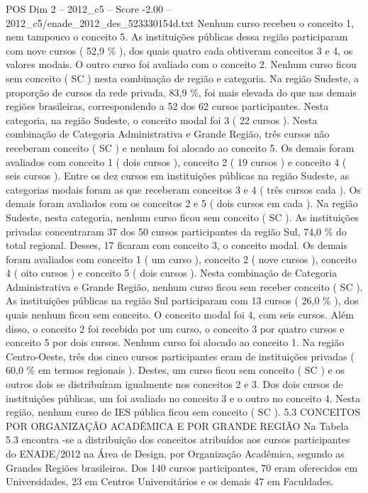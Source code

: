 \begin{textsample}{POS Dim 2 – 2012\_c5 – Score -2.00 – 2012\_c5/enade\_2012\_des\_523330154d.txt}
Nenhum curso recebeu o conceito 1, nem tampouco o conceito 5.
As instituições públicas dessa região participaram com nove cursos ( 52,9 \% ), dos quais quatro cada obtiveram conceitos 3 e 4, os valores modais.
O outro curso foi avaliado com o conceito 2.
Nenhum curso ficou sem conceito ( SC ) nesta combinação de região e categoria.
Na região Sudeste, a proporção de cursos da rede privada, 83,9 \%, foi mais elevada do que nas demais regiões brasileiras, correspondendo a 52 dos 62 cursos participantes.
Nesta categoria, na região Sudeste, o conceito modal foi 3 ( 22 cursos ).
Nesta combinação de Categoria Administrativa e Grande Região, três cursos não receberam conceito ( SC ) e nenhum foi alocado ao conceito 5.
Os demais foram avaliados com conceito 1 ( dois cursos ), conceito 2 ( 19 cursos ) e conceito 4 ( seis cursos ).
Entre os dez cursos em instituições públicas na região Sudeste, as categorias modais foram as que receberam conceitos 3 e 4 ( três cursos cada ).
Os demais foram avaliados com os conceitos 2 e 5 ( dois cursos em cada ).
Na região Sudeste, nesta categoria, nenhum curso ficou sem conceito ( SC ).
As instituições privadas concentraram 37 dos 50 cursos participantes da região Sul, 74,0 \% do total regional.
Desses, 17 ficaram com conceito 3, o conceito modal.
Os demais foram avaliados com conceito 1 ( um curso ), conceito 2 ( nove cursos ), conceito 4 ( oito cursos ) e conceito 5 ( dois cursos ).
Nesta combinação de Categoria Administrativa e Grande Região, nenhum curso ficou sem receber conceito ( SC ).
As instituições públicas na região Sul participaram com 13 cursos ( 26,0 \% ), dos quais nenhum ficou sem conceito.
O conceito modal foi 4, com seis cursos.
Além disso, o conceito 2 foi recebido por um curso, o conceito 3 por quatro cursos e conceito 5 por dois cursos.
Nenhum curso foi alocado ao conceito 1.
Na região Centro-Oeste, três dos cinco cursos participantes eram de instituições privadas ( 60,0 \% em termos regionais ).
Destes, um curso ficou sem conceito ( SC ) e os outros dois se distribuíram igualmente nos conceitos 2 e 3.
Dos dois cursos de instituições públicas, um foi avaliado no conceito 3 e o outro no conceito 4.
Nesta região, nenhum curso de IES pública ficou sem conceito ( SC ). 5.3 CONCEITOS POR ORGANIZAÇÃO ACADÊMICA E POR GRANDE REGIÃO Na Tabela 5.3 encontra -se a distribuição dos conceitos atribuídos aos cursos participantes do ENADE/2012 na Área de Design, por Organização Acadêmica, segundo as Grandes Regiões brasileiras.
Dos 140 cursos participantes, 70 eram oferecidos em Universidades, 23 em Centros Universitários e os demais 47 em Faculdades.

\end{textsample}
